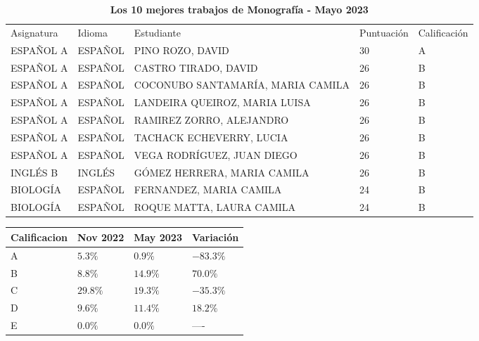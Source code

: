 \documentclass[
  letterpaper,
  DIV=11,
  numbers=noendperiod]{scrartcl}
\begin{document}
\begin{table}

\caption{\label{tbl-mejormonografia-variacion}Mejores trabajos de
Monografía 2023 - Variación de resultados Monografía
2022-2023}\begin{minipage}[t]{\linewidth}

{\centering 

\begin{longtable}{lllll}
\tabularnewline

\caption*{
{\large \textbf{Los 10 mejores trabajos de Monografía - Mayo 2023}}
} \\ 
\toprule
Asignatura & Idioma & Estudiante & Puntuación & Calificación \\ 
\midrule
ESPAÑOL A & ESPAÑOL & PINO ROZO, DAVID & 30 & A \\ 
ESPAÑOL A & ESPAÑOL & CASTRO TIRADO, DAVID & 26 & B \\ 
ESPAÑOL A & ESPAÑOL & COCONUBO SANTAMARÍA, MARIA CAMILA & 26 & B \\ 
ESPAÑOL A & ESPAÑOL & LANDEIRA QUEIROZ, MARIA LUISA & 26 & B \\ 
ESPAÑOL A & ESPAÑOL & RAMIREZ ZORRO, ALEJANDRO & 26 & B \\ 
ESPAÑOL A & ESPAÑOL & TACHACK ECHEVERRY, LUCIA & 26 & B \\ 
ESPAÑOL A & ESPAÑOL & VEGA RODRÍGUEZ, JUAN DIEGO & 26 & B \\ 
INGLÉS B & INGLÉS & GÓMEZ HERRERA, MARIA CAMILA & 26 & B \\ 
BIOLOGÍA & ESPAÑOL & FERNANDEZ, MARIA CAMILA & 24 & B \\ 
BIOLOGÍA & ESPAÑOL & ROQUE MATTA, LAURA CAMILA & 24 & B \\ 
\bottomrule
\end{longtable}

}

\end{minipage}%
\newline
\begin{minipage}[t]{\linewidth}

{\centering 

\begin{longtable}{llll}
\tabularnewline

\toprule
Calificacion & Nov 2022 & May 2023 & Variación \\ 
\midrule
A & $5.3\%$ & $0.9\%$ & $-83.3\%$ \\ 
B & $8.8\%$ & $14.9\%$ & $70.0\%$ \\ 
C & $29.8\%$ & $19.3\%$ & $-35.3\%$ \\ 
D & $9.6\%$ & $11.4\%$ & $18.2\%$ \\ 
E & $0.0\%$ & $0.0\%$ & ---- \\ 
\bottomrule
\end{longtable}

}

\end{minipage}%

\end{table}
\end{document}
